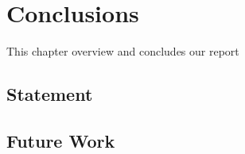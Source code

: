 \chapter{Conclusions}
This chapter overview and concludes our report 
\section{Statement}


\section{Future Work}

